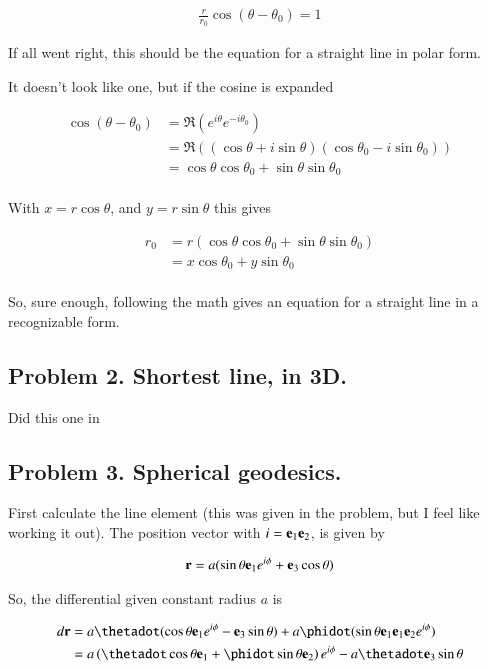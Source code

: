\begin{align*}
\frac{r}{r_0} \cos(\theta - \theta_0) = 1
\end{align*}
 
If all went right, this should be the equation for a straight line in polar form.

It doesn't look like one, but if the cosine is expanded 

\begin{align*}
\cos(\theta - \theta_0) 
&= \Re\left( e^{i\theta}e^{-i\theta_0} \right) \\
&= \Re\left( (\cos\theta + i\sin\theta)(\cos\theta_0 - i\sin\theta_0) \right) \\
&= \cos\theta\cos\theta_0 + \sin\theta\sin\theta_0 \\
\end{align*}

With $x = r\cos\theta$, and $y = r\sin\theta$ this gives

\begin{align*}
r_0 
&= r \left( \cos\theta\cos\theta_0 + \sin\theta\sin\theta_0 \right) \\
&= x \cos\theta_0 + y\sin\theta_0 \\
\end{align*}

So, sure enough, following the math gives an equation for a straight line in a recognizable form.

\subsection{Problem 2. Shortest line, in 3D. }

Did this one in \citep{PJgoldch1}

\subsection{Problem 3.  Spherical geodesics. }

First calculate the line element (this was given in the problem, but I feel like working it out).
The position vector with $i = \mathbf{e}_1 \mathbf{e}_2$, is given by

\begin{align*}
\mathbf{r} = a ( \sin\theta \mathbf{e}_1 e^{i\phi} + \mathbf{e}_3 \cos\theta )
\end{align*}

So, the differential given constant radius $a$ is

\begin{align*}
d\Br 
&= 
a \thetadot ( \cos\theta \Be_1 e^{i\phi} - \Be_3 \sin\theta )
+ a \phidot ( \sin\theta \Be_1 \Be_1 \Be_2 e^{i\phi} ) \\
&= 
a \left( \thetadot \cos\theta \Be_1 + \phidot \sin\theta \Be_2 \right) e^{i\phi} - a \thetadot \Be_3 \sin\theta \\
\end{align*}

